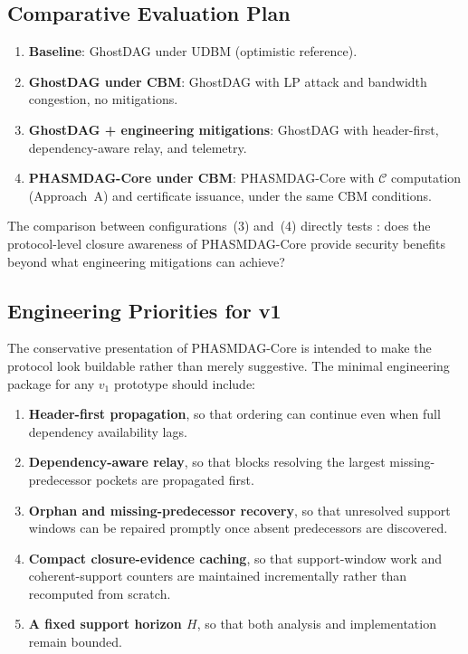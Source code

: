 \documentclass[11pt]{article}
\theoremstyle{definition}
\theoremstyle{plain}
\theoremstyle{remark}
\newcommand{\Clvl}{\mathcal{C}}          %
\begin{document}
\subsection{Comparative Evaluation Plan}

\begin{enumerate}[nosep]
    \item \textbf{Baseline}: GhostDAG under UDBM (optimistic reference).
    \item \textbf{GhostDAG under CBM}: GhostDAG with LP attack and bandwidth
    congestion, no mitigations.
    \item \textbf{GhostDAG + engineering mitigations}: GhostDAG with
    header-first, dependency-aware relay, and telemetry.
    \item \textbf{PHASMDAG-Core under CBM}: PHASMDAG-Core with $\Clvl$ computation
    (Approach~A) and certificate issuance, under the same CBM conditions.
\end{enumerate}

The comparison between configurations~(3) and~(4) directly tests
: does the protocol-level closure awareness
of PHASMDAG-Core provide security benefits beyond what engineering mitigations
can achieve?

\subsection{Engineering Priorities for v1}

The conservative presentation of PHASMDAG-Core is intended to make the
protocol look buildable rather than merely suggestive.
The minimal engineering package for any $v_1$ prototype should include:
\begin{enumerate}[nosep]
    \item \textbf{Header-first propagation}, so that ordering can continue even
    when full dependency availability lags.
    \item \textbf{Dependency-aware relay}, so that blocks resolving the largest
    missing-predecessor pockets are propagated first.
    \item \textbf{Orphan and missing-predecessor recovery}, so that unresolved
    support windows can be repaired promptly once absent predecessors are
    discovered.
    \item \textbf{Compact closure-evidence caching}, so that support-window work
    and coherent-support counters are maintained incrementally rather than
    recomputed from scratch.
    \item \textbf{A fixed support horizon $H$}, so that both analysis and
    implementation remain bounded.
\end{enumerate}
\end{document}
